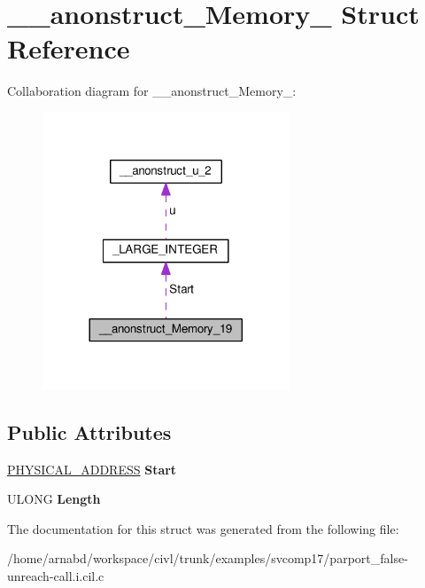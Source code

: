 \hypertarget{struct____anonstruct__Memory__19}{}\section{\+\_\+\+\_\+anonstruct\+\_\+\+Memory\+\_ Struct Reference}
\label{struct____anonstruct__Memory__19}


Collaboration diagram for \+\_\+\+\_\+anonstruct\+\_\+\+Memory\+\_\+:
\nopagebreak
\begin{figure}[H]
\begin{center}
\leavevmode
\includegraphics[width=209pt]{struct____anonstruct__Memory__19__coll__graph}
\end{center}
\end{figure}
\subsection*{Public Attributes}
\begin{DoxyCompactItemize}
\item 
\hypertarget{struct____anonstruct__Memory__19_aae543f4be7ec3d37de840dab3083c0b4}{}\hyperlink{union__LARGE__INTEGER}{P\+H\+Y\+S\+I\+C\+A\+L\+\_\+\+A\+D\+D\+R\+E\+S\+S} {\bfseries Start}\label{struct____anonstruct__Memory__19_aae543f4be7ec3d37de840dab3083c0b4}

\item 
\hypertarget{struct____anonstruct__Memory__19_a5d2f6ec44ec4d953e30be8c4decd8209}{}U\+L\+O\+N\+G {\bfseries Length}\label{struct____anonstruct__Memory__19_a5d2f6ec44ec4d953e30be8c4decd8209}

\end{DoxyCompactItemize}


The documentation for this struct was generated from the following file\+:\begin{DoxyCompactItemize}
\item 
/home/arnabd/workspace/civl/trunk/examples/svcomp17/parport\+\_\+false-\/unreach-\/call.\+i.\+cil.\+c\end{DoxyCompactItemize}
